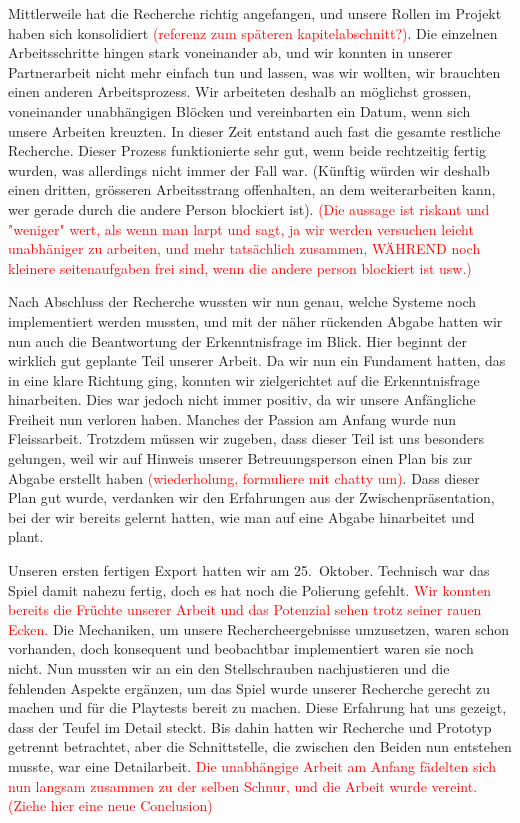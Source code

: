 \documentclass[../Main.tex]{subfiles}
\begin{document}
Mittlerweile hat die Recherche richtig angefangen, und unsere Rollen im Projekt haben sich konsolidiert \textcolor{red}{(referenz zum späteren kapitelabschnitt?)}. Die einzelnen Arbeitsschritte hingen stark voneinander ab, und wir konnten in unserer Partnerarbeit nicht mehr einfach tun und lassen, was wir wollten, wir brauchten einen anderen Arbeitsprozess. Wir arbeiteten deshalb an möglichst grossen, voneinander unabhängigen Blöcken und vereinbarten ein Datum, wenn sich unsere Arbeiten kreuzten. In dieser Zeit entstand auch fast die gesamte restliche Recherche. Dieser Prozess funktionierte sehr gut, wenn beide rechtzeitig fertig wurden, was allerdings nicht immer der Fall war. (Künftig würden wir deshalb einen dritten, grösseren Arbeitsstrang offenhalten, an dem weiterarbeiten kann, wer gerade durch die andere Person blockiert ist). \textcolor{red}{(Die aussage ist riskant und "weniger" wert, als wenn man larpt und sagt, ja wir werden versuchen leicht unabhäniger zu arbeiten, und mehr tatsächlich zusammen, WÄHREND noch kleinere seitenaufgaben frei sind, wenn die andere person blockiert ist usw.)}

Nach Abschluss der Recherche wussten wir nun genau, welche Systeme noch implementiert werden mussten, und mit der näher rückenden Abgabe hatten wir nun auch die Beantwortung der Erkenntnisfrage im Blick. Hier beginnt der wirklich gut geplante Teil unserer Arbeit. Da wir nun ein Fundament hatten, das in eine klare Richtung ging, konnten wir zielgerichtet auf die Erkenntnisfrage hinarbeiten. Dies war jedoch nicht immer positiv, da wir unsere Anfängliche Freiheit nun verloren haben. Manches der Passion am Anfang wurde nun Fleissarbeit. Trotzdem müssen wir zugeben, dass dieser Teil ist uns besonders gelungen, weil wir auf Hinweis unserer Betreuungsperson einen Plan bis zur Abgabe erstellt haben \textcolor{red}{(wiederholung, formuliere mit chatty um)}. Dass dieser Plan gut wurde, verdanken wir den Erfahrungen aus der Zwischenpräsentation, bei der wir bereits gelernt hatten, wie man auf eine Abgabe hinarbeitet und plant.

Unseren ersten fertigen Export hatten wir am 25.~Oktober. Technisch war das Spiel damit nahezu fertig, doch es hat noch die Polierung gefehlt. \textcolor{red}{Wir konnten bereits die Früchte unserer Arbeit und das Potenzial sehen trotz seiner rauen Ecken.} Die Mechaniken, um unsere Rechercheergebnisse umzusetzen, waren schon vorhanden, doch konsequent und beobachtbar implementiert waren sie noch nicht. Nun mussten wir an ein den Stellschrauben nachjustieren und die fehlenden Aspekte ergänzen, um das Spiel wurde unserer Recherche gerecht zu machen und für die Playtests bereit zu machen. Diese Erfahrung hat uns gezeigt, dass der Teufel im Detail steckt. Bis dahin hatten wir Recherche und Prototyp getrennt betrachtet, aber die Schnittstelle, die zwischen den Beiden nun entstehen musste, war eine Detailarbeit. \textcolor{red}{Die unabhängige Arbeit am Anfang fädelten sich nun langsam zusammen zu der selben Schnur, und die Arbeit wurde vereint. (Ziehe hier eine neue Conclusion)}
\end{document}
